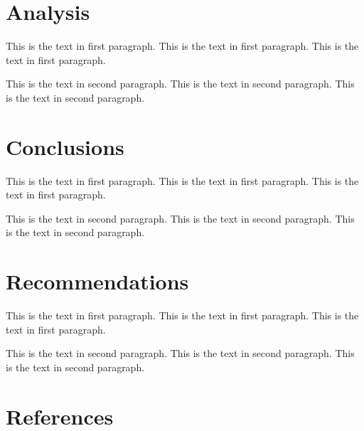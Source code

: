 \documentclass[12pt]{report}
\begin{document}
\newpage\thispagestyle{fancy}\sectionfont{\scshape}
\section*{Analysis}
\par\indent
This is the text in first paragraph. This is the text in first 
paragraph. This is the text in first paragraph.
\\ \par\noindent
This is the text in second paragraph. This is the text in second 
paragraph. This is the text in second paragraph.\\

\newpage\thispagestyle{fancy}\sectionfont{\scshape}
\section*{Conclusions}
\par\indent
This is the text in first paragraph. This is the text in first 
paragraph. This is the text in first paragraph.
\\ \par\noindent
This is the text in second paragraph. This is the text in second 
paragraph. This is the text in second paragraph.\\

\newpage\thispagestyle{fancy}\sectionfont{\scshape}
\section*{Recommendations}
\par\indent
This is the text in first paragraph. This is the text in first 
paragraph. This is the text in first paragraph.
\\ \par\noindent
This is the text in second paragraph. This is the text in second 
paragraph. This is the text in second paragraph.\\


\newpage
\section*{References}
\end{document}
